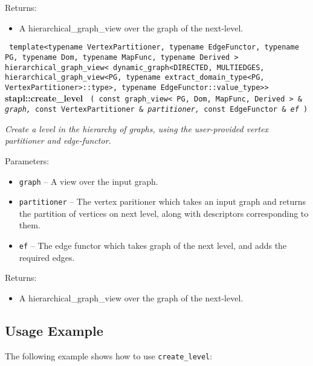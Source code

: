Returns:
\begin{itemize}
\item
A hierarchical\_graph\_view over the graph of the next-level.
\end{itemize}


\noindent
\texttt{%
template<typename VertexPartitioner, typename EdgeFunctor, 
\newline
typename PG, typename Dom, typename MapFunc, typename Derived >
\newline
hierarchical\_graph\_view< dynamic\_graph<DIRECTED, MULTIEDGES, 
\newline
hierarchical\_graph\_view<PG, typename extract\_domain\_type<PG, 
\newline
VertexPartitioner>::type>, typename EdgeFunctor::value\_type>> 
}
\textbf{stapl::create\_level}%
\newline
\texttt{%
(
const graph\_view< PG, Dom, MapFunc, Derived > \&
\textit{graph,}%
const VertexPartitioner \&
\textit{partitioner,}%
const EdgeFunctor \&
\textit{ef}%
)     
}
\vspace{0.4cm}

\textit{
Create a level in the hierarchy of graphs, using the user-provided vertex partitioner and edge-functor.
}
\vspace{0.4cm}

Parameters:
\begin{itemize}
\item
\texttt{graph} --
A view over the input graph.
\item
\texttt{partitioner} --
The vertex paritioner which takes an input graph and returns the partition of vertices on next level, along with descriptors corresponding to them.
\item
\texttt{ef} --
The edge functor which takes graph of the next level, and adds the required edges.
\end{itemize}

Returns:
\begin{itemize}
\item
A hierarchical\_graph\_view over the graph of the next-level.
\end{itemize}

\subsection{Usage Example} \label{sec-create-level-alg-use}

The following example shows how to use 
\texttt{create\_level}:
 

